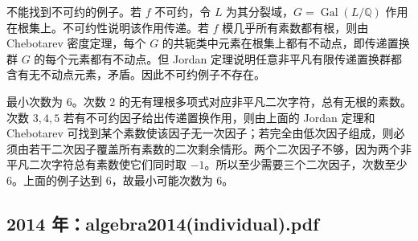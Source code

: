 \documentclass[UTF8,12pt]{ctexart}
\begin{document}
\begin{enumerate}[label=\textbf{\arabic*.},leftmargin=2.2em]
不能找到不可约的例子。若 \(f\) 不可约，令 \(L\) 为其分裂域，\(G=\operatorname{Gal}(L/\mathbb Q)\) 作用在根集上。不可约性说明该作用传递。若 \(f\) 模几乎所有素数都有根，则由 Chebotarev 密度定理，每个 \(G\) 的共轭类中元素在根集上都有不动点，即传递置换群 \(G\) 的每个元素都有不动点。但 Jordan 定理说明任意非平凡有限传递置换群都含有无不动点元素，矛盾。因此不可约例子不存在。

最小次数为 \(6\)。次数 \(2\) 的无有理根多项式对应非平凡二次字符，总有无根的素数。次数 \(3,4,5\) 若有不可约因子给出传递置换作用，则由上面的 Jordan 定理和 Chebotarev 可找到某个素数使该因子无一次因子；若完全由低次因子组成，则必须由若干二次因子覆盖所有素数的二次剩余情形。两个二次因子不够，因为两个非平凡二次字符总有素数使它们同时取 \(-1\)。所以至少需要三个二次因子，次数至少 \(6\)。上面的例子达到 \(6\)，故最小可能次数为 \(6\)。
\end{enumerate}

\subsection{2014 年：algebra2014(individual).pdf}
\end{document}
